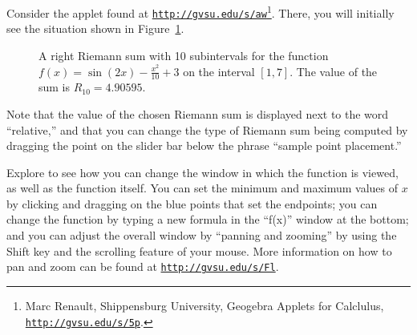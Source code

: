 \begin{pa} \label{PA:4.3}
Consider the applet found at \href{http://gvsu.edu/s/a9}{\texttt{http://gvsu.edu/s/aw}}\footnote{Marc Renault, Shippensburg University, Geogebra Applets for Calclulus, \href{http://gvsu.edu/s/5p}{\texttt{http://gvsu.edu/s/5p}}.}.  There, you will initially see the situation shown in Figure~\ref{F:4.3.GGBApplet}.
\begin{figure}[h]
\begin{center}
\caption{A right Riemann sum with 10 subintervals for the function $f(x) = \sin(2x) - \frac{x^2}{10} + 3$ on the interval $[1,7]$.  The value of the sum is $R_{10} = 4.90595$.} \label{F:4.3.GGBApplet}
\end{center}
\end{figure}
Note that the value of the chosen Riemann sum is displayed next to the word ``relative,'' and that you can change the type of Riemann sum being computed by dragging the point on the slider bar below the phrase ``sample point placement.''

Explore to see how you can change the window in which the function is viewed, as well as the function itself.  You can set the minimum and maximum values of $x$ by clicking and dragging on the blue points that set the endpoints; you can change the function by typing a new formula in the ``f(x)'' window at the bottom; and you can adjust the overall window by ``panning and zooming'' by using the Shift key and the scrolling feature of your mouse.  More information on how to pan and zoom can be found at \href{http://gvsu.edu/s/Fl}{\texttt{http://gvsu.edu/s/Fl}}. 


\end{pa}
